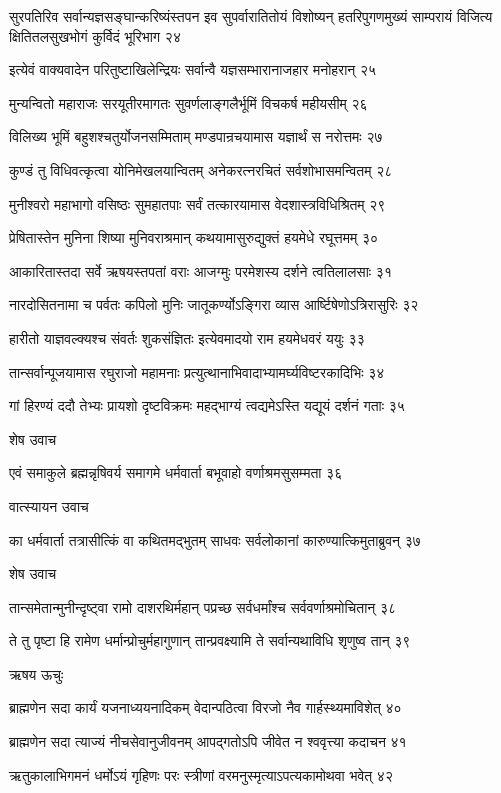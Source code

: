 सुरपतिरिव सर्वान्यज्ञसङ्घान्करिष्यंस्तपन इव सुपर्वारातितोयं विशोष्यन्
हतरिपुगणमुख्यं साम्परायं विजित्य क्षितितलसुखभोगं कुर्विदं भूरिभाग २४

इत्येवं वाक्यवादेन परितुष्टाखिलेन्द्रियः
सर्वान्वै यज्ञसम्भारानाजहार मनोहरान् २५

मुन्यन्वितो महाराजः सरयूतीरमागतः
सुवर्णलाङ्गलैर्भूमिं विचकर्ष महीयसीम् २६

विलिख्य भूमिं बहुशश्चतुर्योजनसम्मिताम्
मण्डपान्रचयामास यज्ञार्थं स नरोत्तमः २७

कुण्डं तु विधिवत्कृत्वा योनिमेखलयान्वितम्
अनेकरत्नरचितं सर्वशोभासमन्वितम् २८

मुनीश्वरो महाभागो वसिष्ठः सुमहातपाः
सर्वं तत्कारयामास वेदशास्त्रविधिश्रितम् २९

प्रेषितास्तेन मुनिना शिष्या मुनिवराश्रमान्
कथयामासुरुद्युक्तं हयमेधे रघूत्तमम् ३०

आकारितास्तदा सर्वे ऋषयस्तपतां वराः
आजग्मुः परमेशस्य दर्शने त्वतिलालसाः ३१

नारदोसितनामा च पर्वतः कपिलो मुनिः
जातूकर्ण्योऽङ्गिरा व्यास आर्ष्टिषेणोऽत्रिरासुरिः ३२

हारीतो याज्ञवल्क्यश्च संवर्तः शुकसंज्ञितः
इत्येवमादयो राम हयमेधवरं ययुः ३३

तान्सर्वान्पूजयामास रघुराजो महामनाः
प्रत्युत्थानाभिवादाभ्यामर्घ्यविष्टरकादिभिः ३४

गां हिरण्यं ददौ तेभ्यः प्रायशो दृष्टविक्रमः
महद्भाग्यं त्वद्यमेऽस्ति यद्यूयं दर्शनं गताः ३५

शेष उवाच

एवं समाकुले ब्रह्मन्नृषिवर्य समागमे
धर्मवार्ता बभूवाहो वर्णाश्रमसुसम्मता ३६

वात्स्यायन उवाच

का धर्मवार्ता तत्रासीत्किं वा कथितमद्भुतम्
साधवः सर्वलोकानां कारुण्यात्किमुताब्रुवन् ३७

शेष उवाच

तान्समेतान्मुनीन्दृष्ट्वा रामो दाशरथिर्महान्
पप्रच्छ सर्वधर्मांश्च सर्ववर्णाश्रमोचितान् ३८

ते तु पृष्टा हि रामेण धर्मान्प्रोचुर्महागुणान्
तान्प्रवक्ष्यामि ते सर्वान्यथाविधि शृणुष्व तान् ३९

ऋषय ऊचुः

ब्राह्मणेन सदा कार्यं यजनाध्ययनादिकम्
वेदान्पठित्वा विरजो नैव गार्हस्थ्यमाविशेत् ४०

ब्राह्मणेन सदा त्याज्यं नीचसेवानुजीवनम्
आपद्गतोऽपि जीवेत न श्ववृत्त्या कदाचन ४१

ऋतुकालाभिगमनं धर्मोऽयं गृहिणः परः
स्त्रीणां वरमनुस्मृत्याऽपत्यकामोथवा भवेत् ४२


